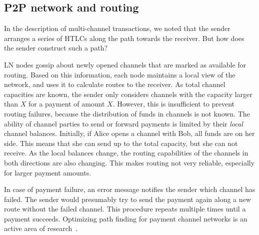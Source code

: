 \subsection{P2P network and routing}

In the description of multi-channel transactions, we noted that the sender arranges a series of HTLCs along the path towards the receiver.
But how does the sender construct such a path?

LN nodes gossip about newly opened channels that are marked as available for routing.
Based on this information, each node maintains a local view of the network, and uses it to calculate routes to the receiver.
As total channel capacities are known, the sender only considers channels with the capacity larger than $X$ for a payment of amount $X$.
However, this is insufficient to prevent routing failures, because the distribution of funds in channels is not known.
The ability of channel parties to send or forward payments is limited by their \textit{local} channel balances.
Initially, if Alice opens a channel with Bob, all funds are on her side.
This means that she can send up to the total capacity, but she can not receive.
As the local balances change, the routing capabilities of the channels in both directions are also changing.
This makes routing not very reliable, especially for larger payment amounts.

In case of payment failure, an error message notifies the sender which channel has failed.
The sender would presumably try to send the payment again along a new route without the failed channel.
This procedure repeats multiple times until a payment succeeds.
Optimizing path finding for payment channel networks is an active area of research~\cite{Pickhardt2019a, Prihodko2016, Grunspan2018, Pickhardt2019, Piatkivskyi2018, Sivaraman2018, Bagaria2019, Roos2018}.

